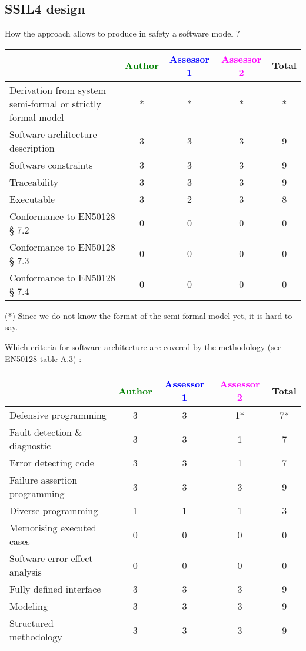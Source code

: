 \subsection{SSIL4 design}

How the approach allows to  produce in safety a software model ?

\begin{tabular}{|l | c | c | c | c|}
\hline
& \textcolor{green}{Author} & \textcolor{blue}{Assessor 1} & \textcolor{magenta}{Assessor 2} & Total \\
\hline
Derivation from system semi-formal or strictly formal model  &* &* & *& * \\
\hline 
Software architecture description  &3 &3 & 3& 9 \\
\hline
Software constraints  &3 &3 & 3& 9 \\
\hline
Traceability  &3 &3 & 3& 9 \\
\hline
Executable  &3 &2 & 3& 8 \\
\hline
Conformance to EN50128 § 7.2  &0 &0 & 0& 0 \\
\hline
Conformance to EN50128 § 7.3  &0 &0 & 0& 0 \\
\hline
Conformance to EN50128 § 7.4  &0 &0 & 0& 0 \\
\hline
\end{tabular}
\begin{author_comment}
(*) Since we do not know the format of the semi-formal model  yet, it is hard to say.
\end{author_comment}

Which criteria for software architecture are covered by the methodology
(see EN50128 table A.3) :

\begin{tabular}{|l | c | c | c | c|}
\hline
& \textcolor{green}{Author} & \textcolor{blue}{Assessor 1} & \textcolor{magenta}{Assessor 2} & Total \\
\hline
Defensive programming  &3 &3 & 1*& 7* \\
\hline 
Fault detection \& diagnostic  &3 &3 & 1& 7 \\
\hline
Error detecting code  &3 &3 & 1& 7 \\
\hline
Failure assertion programming &3 &3 & 3& 9 \\
\hline
Diverse programming &1 &1 & 1& 3 \\
\hline
Memorising executed cases &0 &0 & 0& 0 \\
\hline
Software error effect analysis &0 &0 & 0& 0 \\
\hline
Fully defined interface &3 &3 & 3& 9 \\
\hline
Modeling  &3 &3 & 3& 9 \\
\hline
Structured methodology &3 &3 & 3& 9 \\
\hline
\end{tabular}

